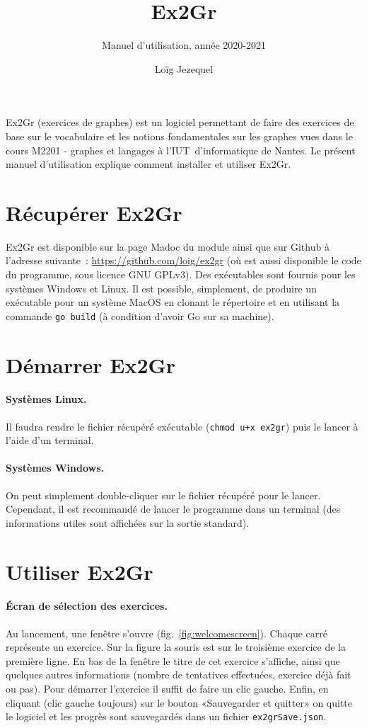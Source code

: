\documentclass[a4paper]{article}
\title{Ex2Gr}
\author{Manuel d'utilisation, année 2020-2021}
\date{Loïg Jezequel}
\begin{document}
\maketitle{}

Ex2Gr (exercices de graphes) est un logiciel permettant de faire des exercices de base sur le vocabulaire et les notions fondamentales sur les graphes vues dans le cours M2201 - graphes et langages à l'IUT d'informatique de Nantes.
Le présent manuel d'utilisation explique comment installer et utiliser Ex2Gr.

\section*{Récupérer Ex2Gr}

Ex2Gr est disponible sur la page Madoc du module ainsi que sur Github à l'adresse suivante~: \url{https://github.com/loig/ex2gr} (où est aussi disponible le code du programme, sous licence GNU GPLv3).
Des exécutables sont fournis pour les systèmes Windows et Linux.
Il est possible, simplement, de produire un exécutable pour un système MacOS en clonant le répertoire et en utilisant la commande \verb|go build| (à condition d'avoir Go sur sa machine).

\section*{Démarrer Ex2Gr}

\paragraph{Systèmes Linux.} Il faudra rendre le fichier récupéré exécutable (\verb|chmod u+x ex2gr|) puis le lancer à l'aide d'un terminal.

\paragraph{Systèmes Windows.} On peut simplement double-cliquer sur le fichier récupéré pour le lancer. Cependant, il est recommandé de lancer le programme dans un terminal (des informations utiles sont affichées sur la sortie standard).

\section*{Utiliser Ex2Gr}

\paragraph{Écran de sélection des exercices.}
Au lancement, une fenêtre s'ouvre (fig.~\ref{fig:welcomescreen}).
Chaque carré représente un exercice.
Sur la figure la souris est sur le troisième exercice de la première ligne.
En bas de la fenêtre le titre de cet exercice s'affiche, ainsi que quelques autres informations (nombre de tentatives effectuées, exercice déjà fait ou pas).
Pour démarrer l'exercice il suffit de faire un clic gauche.
Enfin, en cliquant (clic gauche toujours) sur le bouton «Sauvegarder et quitter» on quitte le logiciel et les progrès sont sauvegardés dans un fichier \verb|ex2grSave.json|.
\end{document}
